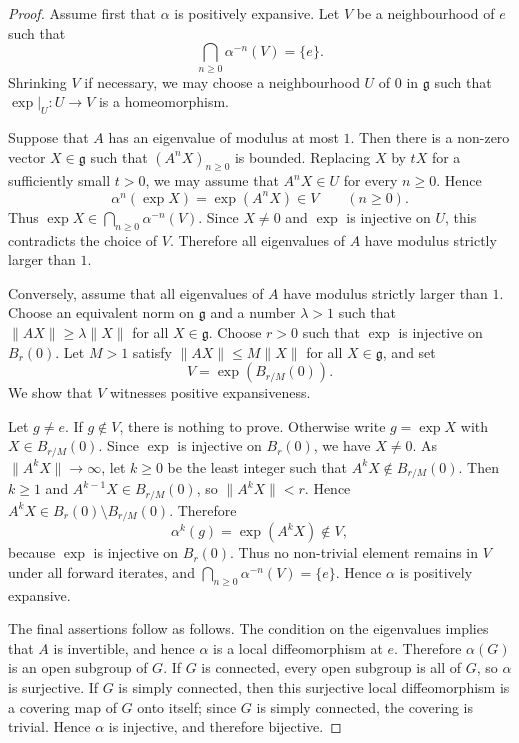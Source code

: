 \documentclass[12pt]{amsart}
\theoremstyle{definition}
\numberwithin{equation}{section}
\theoremstyle{remark}
\begin{document}
\begin{proof}
Assume first that $\alpha$ is positively expansive. Let $V$ be a
neighbourhood of $e$ such that
\[
\bigcap_{n\geq 0}\alpha^{-n}(V)=\{e\}.
\]
Shrinking $V$ if necessary, we may choose a neighbourhood $U$ of $0$ in
$\mathfrak g$ such that $\exp|_U:U\to V$ is a homeomorphism.

Suppose that $A$ has an eigenvalue of modulus at most $1$. Then there is a
non-zero vector $X\in\mathfrak g$ such that $(A^nX)_{n\geq 0}$ is bounded.
 Replacing $X$ by $tX$ for a
sufficiently small $t>0$, we may assume that $A^nX\in U$ for every
$n\geq 0$. Hence
\[
\alpha^n(\exp X)=\exp(A^nX)\in V
\qquad (n\geq 0).
\]
Thus $\exp X\in \bigcap_{n\geq 0}\alpha^{-n}(V)$. Since $X\neq 0$ and
$\exp$ is injective on $U$, this contradicts the choice of $V$. Therefore
all eigenvalues of $A$ have modulus strictly larger than $1$.

Conversely, assume that all eigenvalues of $A$ have modulus strictly larger
than $1$. Choose an equivalent norm on $\mathfrak g$ and a number
$\lambda>1$ such that $\|AX\|\geq \lambda\|X\|$ for all
$X\in\mathfrak g$. Choose $r>0$ such that $\exp$ is injective on $B_r(0)$.
Let $M>1$ satisfy $\|AX\|\leq M\|X\|$ for all $X\in\mathfrak g$, and set
\[
V=\exp(B_{r/M}(0)).
\]
We show that $V$ witnesses positive expansiveness.

Let $g\neq e$. If $g\notin V$, there is nothing to prove. Otherwise write
$g=\exp X$ with $X\in B_{r/M}(0)$. Since $\exp$ is injective on $B_r(0)$,
we have $X\neq 0$. As $\|A^kX\|\to\infty$, let $k\geq 0$ be the least
integer such that $A^kX\notin B_{r/M}(0)$. Then $k\geq 1$ and
$A^{k-1}X\in B_{r/M}(0)$, so $\|A^kX\|<r$. Hence
$A^kX\in B_r(0)\setminus B_{r/M}(0)$. Therefore
\[
\alpha^k(g)=\exp(A^kX)\notin V,
\]
because $\exp$ is injective on $B_r(0)$. Thus no non-trivial element remains
in $V$ under all forward iterates, and
$\bigcap_{n\geq 0}\alpha^{-n}(V)=\{e\}$. Hence $\alpha$ is positively
expansive.


The final assertions follow as follows. The condition on the eigenvalues
implies that $A$ is invertible, and hence $\alpha$ is a local diffeomorphism
at $e$. Therefore $\alpha(G)$ is an open subgroup of $G$. If $G$ is
connected, every open subgroup is all of $G$, so $\alpha$ is surjective. If
$G$ is simply connected, then this surjective local diffeomorphism is a
covering map of $G$ onto itself; since $G$ is simply connected, the covering
is trivial. Hence $\alpha$ is injective, and therefore bijective.
\end{proof}
\end{document}
